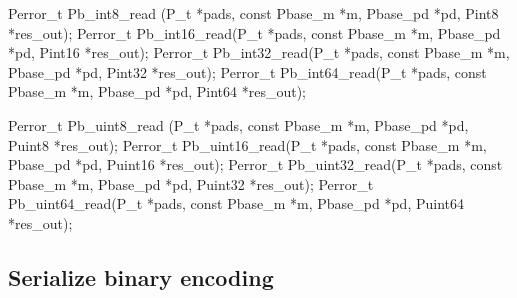 \bBegin{}
\bEnd{}

\begin{tinycodeaux}{\leftmargin=0in}
\codeallowbreaks
Perror_t Pb_int8_read (P_t *pads, const Pbase_m *m,
		       Pbase_pd *pd, Pint8 *res_out);
Perror_t Pb_int16_read(P_t *pads, const Pbase_m *m,
		       Pbase_pd *pd, Pint16 *res_out);
Perror_t Pb_int32_read(P_t *pads, const Pbase_m *m,
		       Pbase_pd *pd, Pint32 *res_out);
Perror_t Pb_int64_read(P_t *pads, const Pbase_m *m,
		       Pbase_pd *pd, Pint64 *res_out);

Perror_t Pb_uint8_read (P_t *pads, const Pbase_m *m,
			Pbase_pd *pd, Puint8 *res_out);
Perror_t Pb_uint16_read(P_t *pads, const Pbase_m *m,
			Pbase_pd *pd, Puint16 *res_out);
Perror_t Pb_uint32_read(P_t *pads, const Pbase_m *m,
			Pbase_pd *pd, Puint32 *res_out);
Perror_t Pb_uint64_read(P_t *pads, const Pbase_m *m,
			Pbase_pd *pd, Puint64 *res_out);
\end{tinycodeaux}

\subsection{Serialize binary encoding}

\sbBegin{}
\bEnd{}

